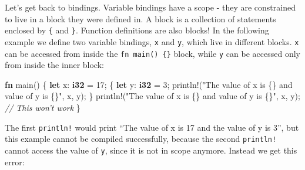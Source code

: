 \documentclass[a4paper,]{book}
\newenvironment{Shaded}{\begin{snugshade}}{\end{snugshade}}
\newcommand{\KeywordTok}[1]{\textcolor[rgb]{0.13,0.29,0.53}{\textbf{{#1}}}}
\newcommand{\DecValTok}[1]{\textcolor[rgb]{0.00,0.00,0.81}{{#1}}}
\newcommand{\StringTok}[1]{\textcolor[rgb]{0.31,0.60,0.02}{{#1}}}
\newcommand{\CommentTok}[1]{\textcolor[rgb]{0.56,0.35,0.01}{\textit{{#1}}}}
\newcommand{\OtherTok}[1]{\textcolor[rgb]{0.56,0.35,0.01}{{#1}}}
\newcommand{\NormalTok}[1]{{#1}}
\begin{document}
Let's get back to bindings. Variable bindings have a scope - they are
constrained to live in a block they were defined in. A block is a
collection of statements enclosed by \texttt{\{} and \texttt{\}}.
Function definitions are also blocks! In the following example we define
two variable bindings, \texttt{x} and \texttt{y}, which live in
different blocks. \texttt{x} can be accessed from inside the
\texttt{fn\ main()\ \{\}} block, while \texttt{y} can be accessed only
from inside the inner block:

\begin{Shaded}
\begin{Highlighting}[]
\KeywordTok{fn} \NormalTok{main() \{}
    \KeywordTok{let} \NormalTok{x: }\KeywordTok{i32} \NormalTok{= }\DecValTok{17}\NormalTok{;}
    \NormalTok{\{}
        \KeywordTok{let} \NormalTok{y: }\KeywordTok{i32} \NormalTok{= }\DecValTok{3}\NormalTok{;}
        \OtherTok{println!}\NormalTok{(}\StringTok{"The value of x is \{\} and value of y is \{\}"}\NormalTok{, x, y);}
    \NormalTok{\}}
    \OtherTok{println!}\NormalTok{(}\StringTok{"The value of x is \{\} and value of y is \{\}"}\NormalTok{, x, y); }\CommentTok{// This won't work}
\NormalTok{\}}
\end{Highlighting}
\end{Shaded}

The first \texttt{println!} would print ``The value of x is 17 and the
value of y is 3'', but this example cannot be compiled successfully,
because the second \texttt{println!} cannot access the value of
\texttt{y}, since it is not in scope anymore. Instead we get this error:

\begin{Shaded}
\end{Shaded}
\end{document}
